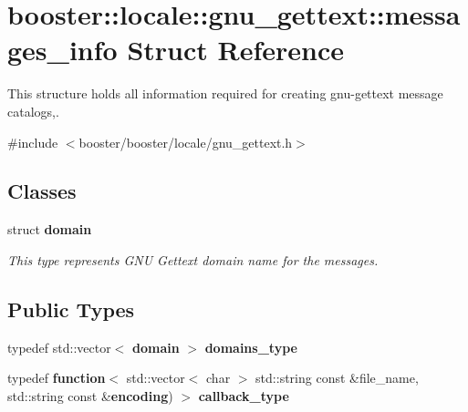 \section{booster\+:\+:locale\+:\+:gnu\+\_\+gettext\+:\+:messages\+\_\+info Struct Reference}
\label{structbooster_1_1locale_1_1gnu__gettext_1_1messages__info}


This structure holds all information required for creating gnu-\/gettext message catalogs,.  




{\ttfamily \#include $<$booster/booster/locale/gnu\+\_\+gettext.\+h$>$}

\subsection*{Classes}
\begin{DoxyCompactItemize}
\item 
struct {\bf domain}
\begin{DoxyCompactList}\small\item\em This type represents G\+NU Gettext domain name for the messages. \end{DoxyCompactList}\end{DoxyCompactItemize}
\subsection*{Public Types}
\begin{DoxyCompactItemize}
\item 
typedef std\+::vector$<$ {\bf domain} $>$ {\bf domains\+\_\+type}
\item 
typedef {\bf function}$<$ std\+::vector$<$ char $>$ std\+::string const \&file\+\_\+name, std\+::string const \&{\bf encoding}) $>$ {\bf callback\+\_\+type}
\end{DoxyCompactItemize}
